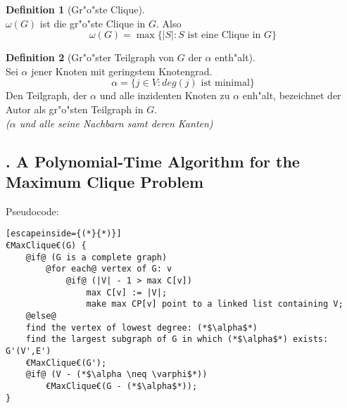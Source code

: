 \documentclass[12pt, xcolor=dvipsnames]{scrartcl}
\theoremstyle{definition}
\newtheorem{definition}{Definition}%
\theoremstyle{definition}
\begin{document}
\begin{definition}[Gr"o"ste Clique]\ \\
    $\omega (G)$ ist die gr"o"ste Clique in $G$. Also 
    \[ \omega (G) = \max\{|S| : S \text{ ist eine Clique in }G\} \]
\end{definition}

\begin{definition}[Gr"o"ster Teilgraph von $G$ der $\alpha$ enth"alt]\ \\
    Sei $\alpha$ jener Knoten mit geringstem Knotengrad. 
    \[ \alpha = \{j \in V : deg(j) \text{ ist minimal}\} \]
    Den Teilgraph, der $\alpha$ und alle inzidenten Knoten zu $\alpha$ enh"alt, bezeichnet der Autor als gr"o"sten Teilgraph in $G$. \\ \textit{($\alpha$ und alle seine Nachbarn samt deren Kanten)}
\end{definition}

\subsection*{. A Polynomial-Time Algorithm for the Maximum Clique Problem}

Pseudocode:


\lstset{style=mystyle}

\begin{lstlisting}[escapeinside={(*}{*)}]
€MaxClique€(G) {
    @if@ (G is a complete graph)
        @for each@ vertex of G: v
            @if@ (|V| - 1 > max C[v])
                max C[v] := |V|;
                make max CP[v] point to a linked list containing V;
    @else@
    find the vertex of lowest degree: (*$\alpha$*)
    find the largest subgraph of G in which (*$\alpha$*) exists: G'(V',E')
    €MaxClique€(G');
    @if@ (V - (*$\alpha \neq \varphi$*))
        €MaxClique€(G - (*$\alpha$*));
}
\end{lstlisting}
\end{document}
